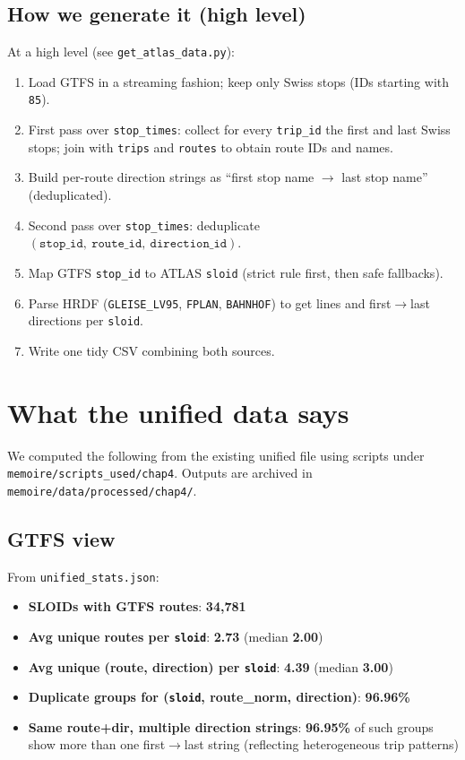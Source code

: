 \subsection{How we generate it (high level)}
At a high level (see \texttt{get\_atlas\_data.py}):
\begin{enumerate}
  \item Load GTFS in a streaming fashion; keep only Swiss stops (IDs starting with \texttt{85}).
  \item First pass over \texttt{stop\_times}: collect for every \texttt{trip\_id} the first and last Swiss stops; join with \texttt{trips} and \texttt{routes} to obtain route IDs and names.
  \item Build per-route direction strings as ``first stop name $\rightarrow$ last stop name'' (deduplicated).
  \item Second pass over \texttt{stop\_times}: deduplicate \((\texttt{stop\_id},\ \texttt{route\_id},\ \texttt{direction\_id})\).
  \item Map GTFS \texttt{stop\_id} to ATLAS \texttt{sloid} (strict rule first, then safe fallbacks).
  \item Parse HRDF (\texttt{GLEISE\_LV95}, \texttt{FPLAN}, \texttt{BAHNHOF}) to get lines and first$\rightarrow$last directions per \texttt{sloid}.
  \item Write one tidy CSV combining both sources.
\end{enumerate}

\section{What the unified data says}
We computed the following from the existing unified file using scripts under \texttt{memoire/scripts\_used/chap4}. Outputs are archived in \texttt{memoire/data/processed/chap4/}.

\subsection*{GTFS view}
From \texttt{unified\_stats.json}:
\begin{itemize}
  \item \textbf{SLOIDs with GTFS routes}: \textbf{34,781}
  \item \textbf{Avg unique routes per \texttt{sloid}}: \textbf{2.73} (median \textbf{2.00})
  \item \textbf{Avg unique (route, direction) per \texttt{sloid}}: \textbf{4.39} (median \textbf{3.00})
  \item \textbf{Duplicate groups for (\texttt{sloid}, route\_norm, direction)}: \textbf{96.96\%}
  \item \textbf{Same route+dir, multiple direction strings}: \textbf{96.95\%} of such groups show more than one first$\rightarrow$last string (reflecting heterogeneous trip patterns)
\end{itemize}


